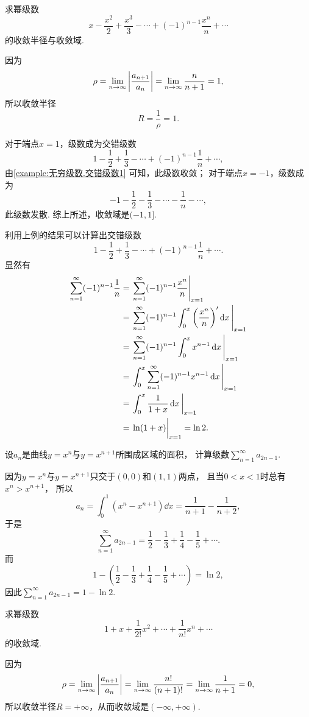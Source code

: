 \begin{example}
求幂级数\[
	x-\frac{x^2}{2}+\frac{x^3}{3}-\dotsb+(-1)^{n-1}\frac{x^n}{n}+\dotsb
\]的收敛半径与收敛域.
\begin{solution}
因为\[
	\rho = \lim_{n\to\infty} \abs{\frac{a_{n+1}}{a_n}}
	= \lim_{n\to\infty} \frac{n}{n+1} = 1,
\]
所以收敛半径\[
	R = \frac1\rho = 1.
\]

对于端点\(x=1\)，级数成为交错级数\[
	1-\frac{1}{2}+\frac{1}{3}-\dotsb+(-1)^{n-1}\frac{1}{n}+\dotsb,
\]
由\cref{example:无穷级数.交错级数1} 可知，此级数收敛；
对于端点\(x=-1\)，级数成为\[
	-1-\frac{1}{2}-\frac{1}{3}-\dotsb-\frac{1}{n}-\dotsb,
\]
此级数发散.
综上所述，收敛域是\((-1,1]\).
\end{solution}
\end{example}
利用上例的结果可以计算出交错级数\[
	1-\frac{1}{2}+\frac{1}{3}-\dotsb+(-1)^{n-1}\frac{1}{n}+\dotsb.
\]
显然有\begin{align*}
	\sum_{n=1}^\infty (-1)^{n-1} \frac{1}{n}
	&= \eval{\sum_{n=1}^\infty (-1)^{n-1} \frac{x^n}{n}}_{x=1} \\
	&= \eval{\sum_{n=1}^\infty (-1)^{n-1} \int_0^x \left(\frac{x^n}{n}\right)' \dd{x}}_{x=1} \\
	&= \eval{\sum_{n=1}^\infty (-1)^{n-1} \int_0^x x^{n-1} \dd{x}}_{x=1} \\
	&= \eval{\int_0^x \sum_{n=1}^\infty (-1)^{n-1} x^{n-1} \dd{x}}_{x=1} \\
	&= \eval{\int_0^x \frac{1}{1+x} \dd{x}}_{x=1} \\
	&= \eval{\ln(1+x)}_{x=1} = \ln2.
\end{align*}
\begin{example}
设\(a_n\)是曲线\(y=x^n\)与\(y=x^{n+1}\)所围成区域的面积，
计算级数\(\sum_{n=1}^\infty a_{2n-1}\).
\begin{solution}
因为\(y = x^n\)与\(y = x^{n+1}\)只交于\((0,0)\)和\((1,1)\)两点，
且当\(0 < x < 1\)时总有\(x^n > x^{n+1}\)，
所以\[
	a_n = \int_0^1 (x^n - x^{n+1}) \dd{x}
	= \frac1{n+1} - \frac1{n+2},
\]
于是\[
	\sum_{n=1}^\infty a_{2n-1}
	= \frac12 - \frac13 + \frac14 - \frac15 + \dotsb.
\]
而\[
	1 - \left(\frac12 - \frac13 + \frac14 - \frac15 + \dotsb\right)
	= \ln2,
\]
因此\(\sum_{n=1}^\infty a_{2n-1} = 1 - \ln2\).
\end{solution}
\end{example}

\begin{example}
求幂级数\[
	1+x+\frac{1}{2!}x^2+\dotsb+\frac{1}{n!}x^n+\dotsb
\]的收敛域.
\begin{solution}
因为\[
	\rho = \lim_{n\to\infty} \abs{\frac{a_{n+1}}{a_n}}
	= \lim_{n\to\infty} \frac{n!}{(n+1)!}
	= \lim_{n\to\infty} \frac{1}{n+1}
	= 0,
\]
所以收敛半径\(R = +\infty\)，从而收敛域是\((-\infty,+\infty)\).
\end{solution}
\end{example}

